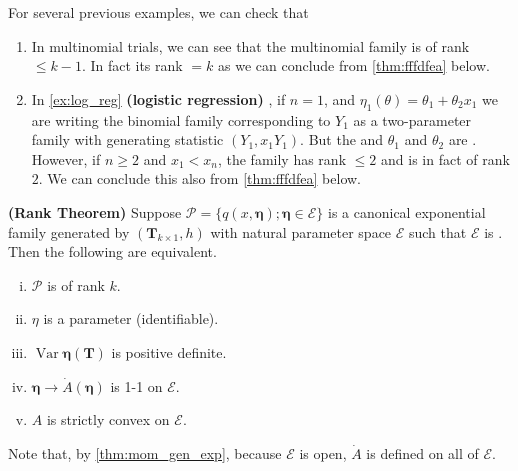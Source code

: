 \documentclass{article}
\newcommand{\bfs}[1]{\textbf{({#1}) }}
\begin{document}
\begin{exma} For several previous examples, we can check that
\begin{enumerate}
    \item In {multinomial trials}, we can see that the multinomial family is of rank $\le k-1$. In fact its rank $=k$ as we can conclude from  \cref{thm:fffdfea} below.
    \item  In \cref{ex:log_reg} \bfs{logistic regression},  if $n=1$, and $\eta_{1}(\theta)=\theta_{1}+\theta_{2} x_{1}$ we are writing the  binomial family corresponding to $Y_{1}$ as a two-parameter family with generating statistic $\left(Y_{1}, x_{1} Y_{1}\right).$ But the  and $\theta_{1}$ and $\theta_{2}$ are . However, if $n \geq 2$ and $x_{1}<x_{n}$, the family has rank $\leq 2$ and is in fact of rank $2$. We can conclude this also from \cref{thm:fffdfea} below.
\end{enumerate}
\end{exma}
\begin{thma}\label{thm:fffdfea}\bfs{Rank Theorem}
 Suppose $\mathcal{P}=\{q(x, \boldsymbol{\eta}) ; \boldsymbol{\eta} \in \mathcal{E}\}$ is a canonical exponential family generated by $\left(\mathbf{T}_{k \times 1}, h\right)$ with natural parameter space $\mathcal{E}$ such that $\mathcal{E}$ is . Then the following are equivalent.
 \begin{enumerate}[(i)]
     \item $\mathcal{P}$ is of rank $k$.
     \item $\eta$ is a parameter (identifiable).
     \item $\operatorname{Var} \boldsymbol{\eta}(\mathbf{T})$ is positive definite.
     \item $\boldsymbol{\eta} \rightarrow \dot{A}(\boldsymbol{\eta})$ is 1-1 on $\mathcal{E}$.
     \item $A$ is strictly convex on $\mathcal{E}$.
 \end{enumerate}
\end{thma}
\begin{rema}
Note that, by \cref{thm:mom_gen_exp}, because $\mathcal{E}$ is open, $\dot{A}$ is defined on all of $\mathcal{E}$.
\end{rema}
\end{document}
